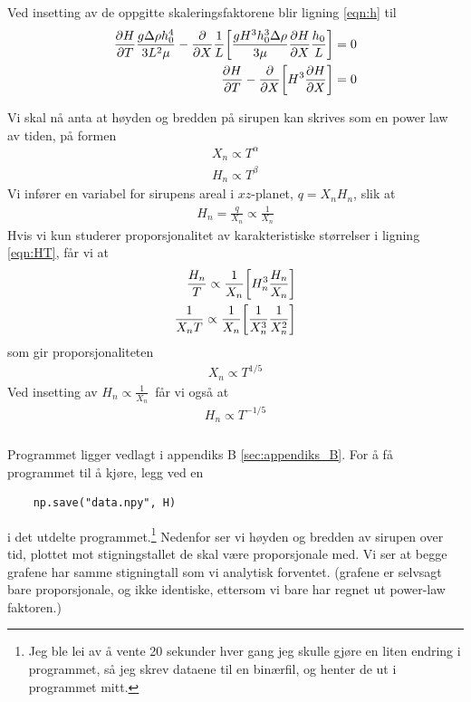 \documentclass[12p,a4paper]{article}
\begin{document}
\subsubsection{}
Ved insetting av de oppgitte skaleringsfaktorene blir ligning \ref{eqn:h} til
\begin{align}\label{eqn:HT}
    \frac{\partial H}{\partial T}\frac{g\Delta\rho h_0^4}{3L^2\mu} - \frac{\partial}{\partial X}\frac{1}{L}\qty[\frac{gH^3h_0^3\Delta\rho}{3\mu}\frac{\partial H}{\partial X}\frac{h_0}{L}] = 0 \\
    \frac{\partial H}{\partial T} - \frac{\partial}{\partial X}\qty[H^3\frac{\partial H}{\partial X}] = 0
\end{align}

Vi skal nå anta at høyden og bredden på sirupen kan skrives som en power law av tiden, på formen
\begin{align*}
    X_n \propto T^{\alpha} \\
    H_n \propto T^{\beta}
\end{align*}
Vi infører en variabel for sirupens areal i $xz$-planet, $q = X_nH_n$, slik at \begin{align*}
    H_n = \frac{q}{X_n} \propto \frac{1}{X_n}
\end{align*}
Hvis vi kun studerer proporsjonalitet av karakteristiske størrelser i ligning \ref{eqn:HT}, får vi at
\begin{align*}
    \frac{H_n}{T} \propto \frac{1}{X_n}\qty[H_n^3\frac{H_n}{X_n}] \\
    \frac{1}{X_nT} \propto \frac{1}{X_n}\qty[\frac{1}{X_n^3}\frac{1}{X_n^2}]\\
\end{align*}
som gir proporsjonaliteten
\begin{align*}
    X_n \propto T^{1/5}
\end{align*}
Ved insetting av $H_n \propto \frac{1}{X_n}$ får vi også at
\begin{align*}
    H_n \propto T^{-1/5}
\end{align*}



\subsubsection{}
Programmet ligger vedlagt i appendiks B \ref{sec:appendiks_B}. For å få programmet til å kjøre, legg ved en
\begin{verbatim}
    np.save("data.npy", H)
\end{verbatim}
i det utdelte programmet.\footnote{Jeg ble lei av å vente 20 sekunder hver gang jeg skulle gjøre en liten endring i programmet, så jeg skrev dataene til en binærfil, og henter de ut i programmet mitt.} Nedenfor ser vi høyden og bredden av sirupen over tid, plottet mot stigningstallet de skal være proporsjonale med. Vi ser at begge grafene har samme stigningtall som vi analytisk forventet. (grafene er selvsagt bare proporsjonale, og ikke identiske, ettersom vi bare har regnet ut power-law faktoren.)
\end{document}
